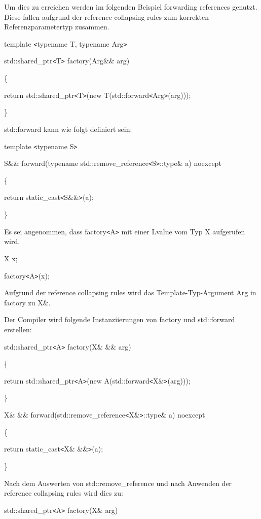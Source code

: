 \documentclass{article}
\begin{document}
Um dies zu erreichen werden im folgenden Beispiel forwarding references genutzt. 
Diese fallen aufgrund der reference collapsing rules zum korrekten Referenzparametertyp 
zusammen.

template \texttt{<}typename T, typename Arg\texttt{>}

std::shared\_ptr\texttt{<}T\texttt{>} factory(Arg\&\& arg)

\{    

\parindent=14pt
return std::shared\_ptr\texttt{<}T\texttt{>}(new T(std::forward\texttt{<}Arg\texttt{>}(arg)));

\parindent=0pt
\}

std::forward kann wie folgt definiert sein:

template \texttt{<}typename S\texttt{>}

S\&\& forward(typename std::remove\_reference\texttt{<}S\texttt{>}::type\& a) noexcept

\{    

\parindent=14pt
return static\_cast\texttt{<}S\&\&\texttt{>}(a);

\parindent=0pt
\}

Es sei angenommen, dass factory\texttt{<}A\texttt{>} mit einer Lvalue vom Typ X 
aufgerufen wird.

X x;

factory\texttt{<}A\texttt{>}(x);

Aufgrund der reference collapsing rules wird das Template-Typ-Argument Arg in factory 
zu X\&.

Der Compiler wird folgende Instanziierungen von factory und std::forward erstellen:

std::shared\_ptr\texttt{<}A\texttt{>} factory(X\& \&\& arg)

\{    

\parindent=14pt
return std::shared\_ptr\texttt{<}A\texttt{>}(new A(std::forward\texttt{<}X\&\texttt{>}(arg)));

\parindent=0pt
\}

X\& \&\& forward(std::remove\_reference\texttt{<}X\&\texttt{>}::type\& a) noexcept

\{    

\parindent=14pt
return static\_cast\texttt{<}X\& \&\&\texttt{>}(a);

\parindent=0pt
\}

Nach dem Auswerten von std::remove\_reference und nach Anwenden der reference collapsing 
rules wird dies zu:

std::shared\_ptr\texttt{<}A\texttt{>} factory(X\& arg)
\end{document}
